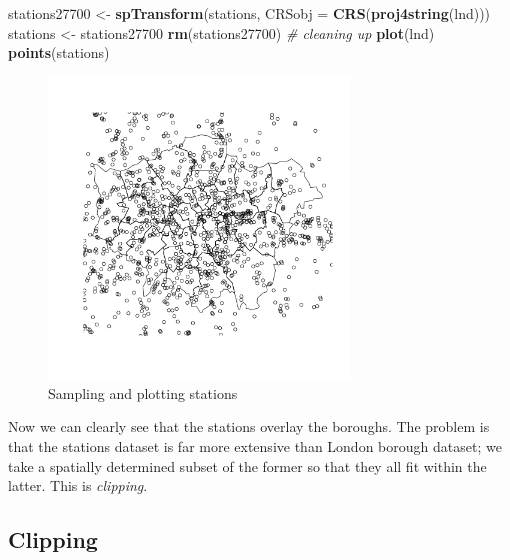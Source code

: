 \documentclass[]{article}
\newenvironment{Shaded}{}{}
\newcommand{\KeywordTok}[1]{\textcolor[rgb]{0.00,0.44,0.13}{\textbf{{#1}}}}
\newcommand{\DataTypeTok}[1]{\textcolor[rgb]{0.56,0.13,0.00}{{#1}}}
\newcommand{\CommentTok}[1]{\textcolor[rgb]{0.38,0.63,0.69}{\textit{{#1}}}}
\newcommand{\NormalTok}[1]{{#1}}
\let\Oldincludegraphics\includegraphics
\renewcommand{\includegraphics}[1]{\Oldincludegraphics[width=8cm]{#1}}
\begin{document}
\begin{Shaded}
\begin{Highlighting}[]
\NormalTok{stations27700 <- }\KeywordTok{spTransform}\NormalTok{(stations, }\DataTypeTok{CRSobj =} \KeywordTok{CRS}\NormalTok{(}\KeywordTok{proj4string}\NormalTok{(lnd)))}
\NormalTok{stations <- stations27700}
\KeywordTok{rm}\NormalTok{(stations27700)  }\CommentTok{# cleaning up}
\KeywordTok{plot}\NormalTok{(lnd)}
\KeywordTok{points}\NormalTok{(stations)}
\end{Highlighting}
\end{Shaded}
\begin{figure}[htbp]
\centering
\includegraphics{figure/Sampling_and_plotting_stations.png}
\caption{Sampling and plotting stations}
\end{figure}

Now we can clearly see that the stations overlay the boroughs. The
problem is that the stations dataset is far more extensive than London
borough dataset; we take a spatially determined subset of the former so
that they all fit within the latter. This is \emph{clipping}.

\subsection{Clipping}
\end{document}
